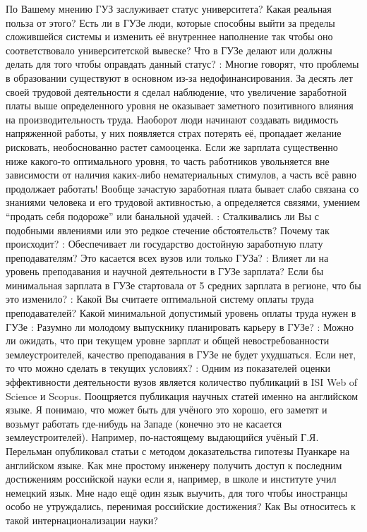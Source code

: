 \begin{drama}
По Вашему мнению ГУЗ заслуживает статус университета? Какая реальная польза от этого? Есть ли в ГУЗе люди, которые способны выйти за пределы сложившейся системы и изменить её внутреннее наполнение так чтобы оно соответствовало университетской вывеске? Что в ГУЗе делают или должны делать для того чтобы оправдать данный статус? 
	\maxspeaks: Многие говорят, что проблемы в образовании существуют в основном из-за недофинансирования. За десять лет своей трудовой деятельности я сделал наблюдение, что увеличение заработной платы выше определенного уровня не оказывает заметного позитивного влияния на производительность труда. Наоборот люди начинают создавать видимость напряженной работы, у них появляется страх потерять её, пропадает желание рисковать, необоснованно растет самооценка. Если же зарплата существенно ниже какого-то оптимального уровня, то часть работников увольняется вне зависимости от наличия каких-либо нематериальных стимулов, а часть всё равно продолжает работать!  Вообще зачастую заработная плата бывает слабо связана со знаниями человека и его трудовой активностью, а определяется связями,  умением “продать себя подороже” или банальной удачей.
	\maxspeaks: Сталкивались ли Вы с подобными явлениями или это редкое стечение обстоятельств? Почему так происходит? 
	\maxspeaks: Обеспечивает ли государство достойную заработную плату преподавателям? Это касается всех вузов или только ГУЗа?
	\maxspeaks: Влияет ли на уровень преподавания и научной деятельности в ГУЗе зарплата? Если бы минимальная зарплата в ГУЗе стартовала от 5 средних зарплата в регионе, что бы это изменило?
	\maxspeaks: Какой Вы считаете оптимальной систему оплаты труда преподавателей? Какой минимальной допустимый уровень оплаты труда нужен в ГУЗе
	\maxspeaks: Разумно ли молодому выпускнику планировать карьеру в ГУЗе?
	\maxspeaks: Можно ли ожидать, что при текущем уровне зарплат и общей невостребованности землеустроителей, качество преподавания в ГУЗе не будет ухудшаться. Если нет, то что можно сделать в текущих условиях?
	\maxspeaks: Одним из показателей оценки эффективности деятельности вузов является количество публикаций в ISI Web of Science и Scopus. Поощряется публикация научных статей именно на английском языке. Я понимаю, что может быть для учёного это хорошо, его заметят и возьмут работать где-нибудь на Западе (конечно это не касается землеустроителей). Например, по-настоящему выдающийся учёный Г.Я. Перельман опубликовал статьи с методом доказательства гипотезы Пуанкаре на английском языке. Как мне простому инженеру получить доступ к последним достижениям российской науки если я, например, в школе и институте учил немецкий язык. Мне надо ещё один язык выучить, для того чтобы иностранцы особо не утруждались, перенимая российские достижения? Как Вы относитесь к такой интернационализации науки?

\end{drama}
